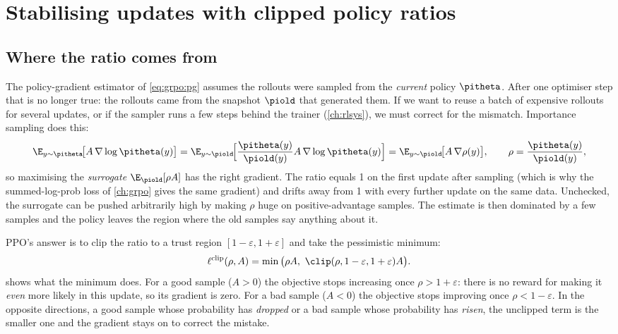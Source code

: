 \section{Stabilising updates with clipped policy ratios}\label{sec:grpo2:clip}

\subsection{Where the ratio comes from}\label{sec:grpo2:ratio}

The policy-gradient estimator of \cref{eq:grpo:pg} assumes the rollouts were sampled from the
\emph{current} policy $\pitheta$. After one optimiser step that is no longer true: the
rollouts came from the snapshot $\piold$ that generated them. If we want to reuse a batch
of expensive rollouts for several updates, or if the sampler runs a few steps behind the
trainer (\cref{ch:rlsys}), we must correct for the mismatch. Importance sampling does this:
\begin{equation}
\E_{y\sim\pitheta}\!\big[A\,\nabla\log\pitheta(y)\big]
=\E_{y\sim\piold}\!\Big[\frac{\pitheta(y)}{\piold(y)}A\,\nabla\log\pitheta(y)\Big]
=\E_{y\sim\piold}\!\big[A\,\nabla\rho(y)\big],\qquad \rho=\frac{\pitheta(y)}{\piold(y)},
\end{equation}
so maximising the \emph{surrogate} $\E_{\piold}[\rho A]$ has the right gradient. The ratio
equals 1 on the first update after sampling (which is why the summed-log-prob loss of
\cref{ch:grpo} gives the same gradient) and drifts away from 1 with every further update on
the same data. Unchecked, the surrogate can be pushed arbitrarily high by making $\rho$ huge
on positive-advantage samples. The estimate is then dominated by a few samples and the
policy leaves the region where the old samples say anything about it.

PPO's answer is to clip the ratio to a trust region $[1-\varepsilon,1+\varepsilon]$ and take
the pessimistic minimum:
\begin{equation}
\ell^{\text{clip}}(\rho,A)=\min\big(\rho A,\ \clip(\rho,1-\varepsilon,1+\varepsilon)A\big).
\label{eq:grpo2:clip}
\end{equation}
 shows what the minimum does. For a good sample ($A>0$) the
objective stops increasing once $\rho>1+\varepsilon$: there is no reward for making it
\emph{even} more likely in this update, so its gradient is zero. For a bad sample ($A<0$) the
objective stops improving once $\rho<1-\varepsilon$. In the opposite directions, a good sample
whose probability has \emph{dropped} or a bad sample whose probability has \emph{risen}, the
unclipped term is the smaller one and the gradient stays on to correct the mistake.

